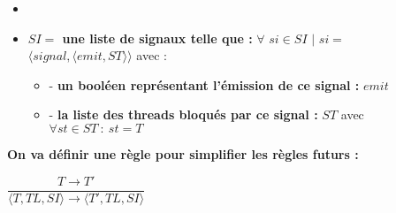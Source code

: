 \documentclass[10pt,a4paper]{report}
\begin{document}
\begin{itemize}
\begin{itemize}
\begin{itemize}
\begin{itemize}
      \end{itemize}
    \end{itemize}	
  \end{itemize}
\item[]
\item[] \textbf{$SI =$ une liste de signaux telle que :} $\forall$ $si \in SI$ $|$ $si =$ $\langle signal,\langle emit,ST\rangle\rangle$ avec :
  \begin{itemize}
  \item[] - \textbf{un booléen représentant l'émission de ce signal :} $emit$
  \item[] - \textbf{la liste des threads bloqués par ce signal :} $ST$ avec $\forall st \in ST~:~st = T$
  \end{itemize}
\end{itemize}
\bigbreak
\bigbreak




\textbf{On va définir une règle pour simplifier les règles futurs :} 
\begin{center}
  $\dfrac{T \rightarrow T'}{\langle T,TL,SI\rangle \rightarrow \langle T',TL,SI\rangle}$
\end{center}
\bigbreak
\bigbreak
\end{document}
